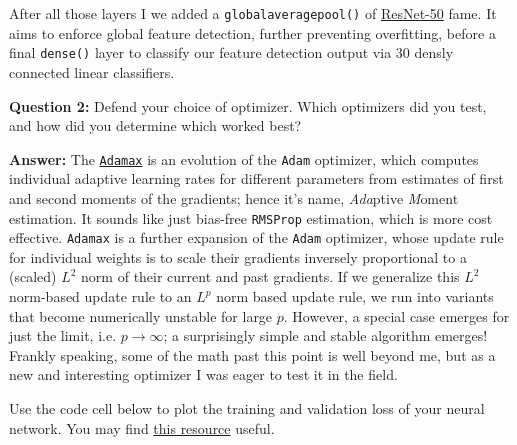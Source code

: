 \documentclass[11pt]{article}
\begin{document}
After all those layers I we added a \texttt{globalaveragepool()} of
\href{https://keras.io/applications/\#resnet50}{ResNet-50} fame. It aims
to enforce global feature detection, further preventing overfitting,
before a final \texttt{dense()} layer to classify our feature detection
output via 30 densly connected linear classifiers.

\textbf{Question 2:} Defend your choice of optimizer. Which optimizers
did you test, and how did you determine which worked best?

\textbf{Answer:} The
\href{https://arxiv.org/pdf/1412.6980.pdf}{\texttt{Adamax}} is an
evolution of the \texttt{Adam} optimizer, which computes individual
adaptive learning rates for different parameters from estimates of first
and second moments of the gradients; hence it's name, \emph{Ada}ptive
\emph{M}oment estimation. It sounds like just bias-free \texttt{RMSProp}
estimation, which is more cost effective. \texttt{Adamax} is a further
expansion of the \texttt{Adam} optimizer, whose update rule for
individual weights is to scale their gradients inversely proportional to
a (scaled) \(L^2\) norm of their current and past gradients. If we
generalize this \(L^2\) norm-based update rule to an \(L^p\) norm based
update rule, we run into variants that become numerically unstable for
large \(p\). However, a special case emerges for just the limit, i.e.
\(p → ∞\); a surprisingly simple and stable algorithm emerges! Frankly
speaking, some of the math past this point is well beyond me, but as a
new and interesting optimizer I was eager to test it in the field.

Use the code cell below to plot the training and validation loss of your
neural network. You may find
\href{http://machinelearningmastery.com/display-deep-learning-model-training-history-in-keras/}{this
resource} useful.
\end{document}

